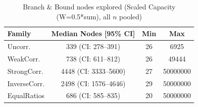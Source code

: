 \begin{table}[tb]
\centering
\caption{Branch $\&$ Bound nodes explored (Scaled Capacity (W=0.5*sum), all $n$ pooled)}
\label{tab:scaled-bb-nodes}
\begin{tabular}{lccc}
\toprule
Family & Median Nodes [95\% CI] & Min & Max \\
\midrule
Uncorr. & 339 (CI: 278–391) & 26 & 6925 \\
WeakCorr. & 738 (CI: 611–812) & 26 & 49444 \\
StrongCorr. & 4448 (CI: 3333–5600) & 27 & 50000000 \\
InverseCorr. & 2498 (CI: 1576–4646) & 29 & 50000000 \\
EqualRatios & 686 (CI: 585–835) & 20 & 50000000 \\
\bottomrule
\end{tabular}
\end{table}
